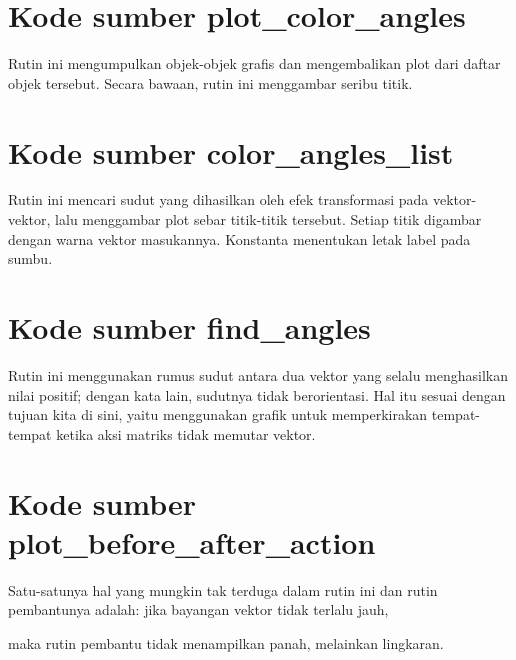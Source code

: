 


\section{Kode sumber plot\_color\_angles}
Rutin ini mengumpulkan objek-objek grafis dan mengembalikan plot dari daftar
objek tersebut.
Secara bawaan, rutin ini menggambar seribu titik.


\section{Kode sumber color\_angles\_list}
Rutin ini mencari sudut yang dihasilkan oleh efek transformasi pada
vektor-vektor, lalu menggambar plot sebar titik-titik tersebut.
Setiap titik digambar dengan warna vektor masukannya.
Konstanta  menentukan letak label pada sumbu.


\section{Kode sumber find\_angles}
Rutin ini menggunakan rumus sudut antara dua vektor yang selalu menghasilkan
nilai positif; dengan kata lain, sudutnya tidak berorientasi.
Hal itu sesuai dengan tujuan kita di sini, yaitu menggunakan grafik untuk
memperkirakan tempat-tempat ketika aksi matriks tidak memutar vektor.



\section{Kode sumber plot\_before\_after\_action}
Satu-satunya hal yang mungkin tak terduga dalam rutin ini dan rutin
pembantunya adalah: jika bayangan vektor tidak terlalu jauh,

maka rutin pembantu tidak menampilkan panah, melainkan lingkaran.

\endinput

PERLU DITINJAU
